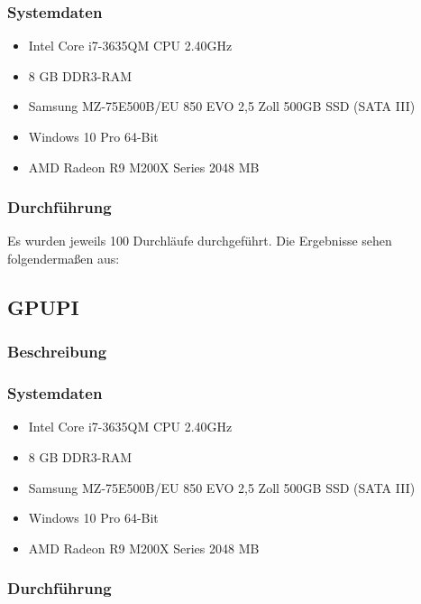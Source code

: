 \subsubsection{Systemdaten}
\begin{itemize}
\item Intel Core i7-3635QM CPU 2.40GHz
\item 8 GB DDR3-RAM
\item Samsung MZ-75E500B/EU 850 EVO 2,5 Zoll 500GB SSD (SATA III)
\item Windows 10 Pro 64-Bit
\item AMD Radeon R9 M200X Series 2048 MB
\end{itemize}
\subsubsection{Durchführung}
Es wurden jeweils 100 Durchläufe durchgeführt.
Die Ergebnisse sehen folgendermaßen aus:

\subsection{GPUPI}
\subsubsection{Beschreibung}
\subsubsection{Systemdaten}
\begin{itemize}
\item Intel Core i7-3635QM CPU 2.40GHz
\item 8 GB DDR3-RAM
\item Samsung MZ-75E500B/EU 850 EVO 2,5 Zoll 500GB SSD (SATA III)
\item Windows 10 Pro 64-Bit
\item AMD Radeon R9 M200X Series 2048 MB
\end{itemize}
\subsubsection{Durchführung}

